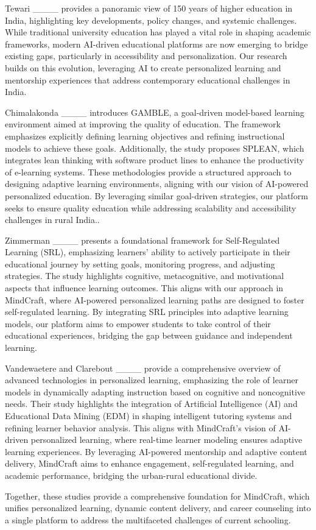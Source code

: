 Tewari ____ provides a panoramic view of 150 years of higher education in India, highlighting key developments, policy changes, and systemic challenges. While traditional university education has played a vital role in shaping academic frameworks, modern AI-driven educational platforms are now emerging to bridge existing gaps, particularly in accessibility and personalization. Our research builds on this evolution, leveraging AI to create personalized learning and mentorship experiences that address contemporary educational challenges in India.

Chimalakonda ____ introduces GAMBLE, a goal-driven model-based learning environment aimed at improving the quality of education. The framework emphasizes explicitly defining learning objectives and refining instructional models to achieve these goals. Additionally, the study proposes SPLEAN, which integrates lean thinking with software product lines to enhance the productivity of e-learning systems. These methodologies provide a structured approach to designing adaptive learning environments, aligning with our vision of AI-powered personalized education. By leveraging similar goal-driven strategies, our platform seeks to ensure quality education while addressing scalability and accessibility challenges in rural India..

Zimmerman ____ presents a foundational framework for Self-Regulated Learning (SRL), emphasizing learners' ability to actively participate in their educational journey by setting goals, monitoring progress, and adjusting strategies. The study highlights cognitive, metacognitive, and motivational aspects that influence learning outcomes. This aligns with our approach in MindCraft, where AI-powered personalized learning paths are designed to foster self-regulated learning. By integrating SRL principles into adaptive learning models, our platform aims to empower students to take control of their educational experiences, bridging the gap between guidance and independent learning.


Vandewaetere and Clarebout ____ provide a comprehensive overview of advanced technologies in personalized learning, emphasizing the role of learner models in dynamically adapting instruction based on cognitive and noncognitive needs. Their study highlights the integration of Artificial Intelligence (AI) and Educational Data Mining (EDM) in shaping intelligent tutoring systems and refining learner behavior analysis. This aligns with MindCraft's vision of AI-driven personalized learning, where real-time learner modeling ensures adaptive learning experiences. By leveraging AI-powered mentorship and adaptive content delivery, MindCraft aims to enhance engagement, self-regulated learning, and academic performance, bridging the urban-rural educational divide.

Together, these studies provide a comprehensive foundation for MindCraft, which unifies personalized learning, dynamic content delivery, and career counseling into a single platform to address the multifaceted challenges of current schooling.


